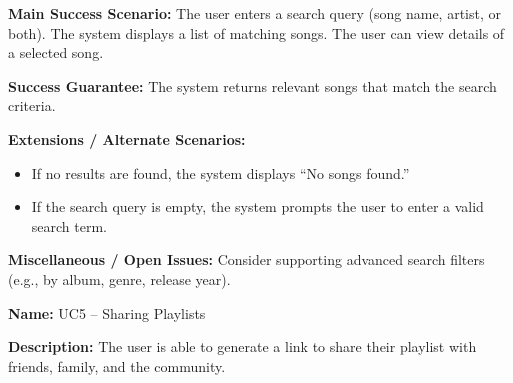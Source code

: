 \documentclass[12pt]{article}
\begin{document}
\textbf{Main Success Scenario:}  
The user enters a search query (song name, artist, or both). The system displays a list of matching songs. The user can view details of a selected song.  

\textbf{Success Guarantee:}  
The system returns relevant songs that match the search criteria.  

\textbf{Extensions / Alternate Scenarios:}  
\begin{itemize}[noitemsep]
  \item If no results are found, the system displays ``No songs found.''
  \item If the search query is empty, the system prompts the user to enter a valid search term.
\end{itemize}

\textbf{Miscellaneous / Open Issues:}  
Consider supporting advanced search filters (e.g., by album, genre, release year).  

\vspace{1em}

\textbf{Name:} UC5 -- Sharing Playlists  

\textbf{Description:}  
The user is able to generate a link to share their playlist with friends, family, and the community.  
\end{document}
